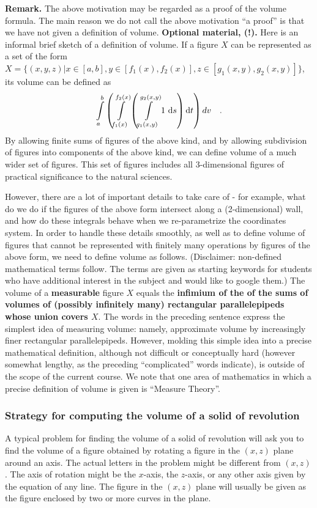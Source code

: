 \documentclass[12pt]{book}
\renewcommand{\emph}{\textbf}
\begin{document}
\textbf{Remark.} The above motivation may be regarded as a proof of the volume formula. The main reason we do not call the above motivation ``a proof'' is that we have not given a definition of volume. \textbf{Optional material, (!).} Here is an informal brief sketch  of a definition of volume. If a figure $X$ can be represented as a set of the form $X= \{(x,y,z)| x\in [a,b], y\in [f_1(x), f_2(x)], z\in [g_1(x,y),  g_2(x,y)]\}$, its volume can be defined as
\[
\int\limits_a^b \left(\int\limits_{f_1(x)}^{f_2(x)}\left(\int\limits_{g_1(x,y)}^{g_2(x,y)} 1 ~ {\normalfont \text{d}} s \right){\normalfont \text{d}} t \right)dv \quad .
\]
By allowing finite sums of figures of the above kind, and by allowing subdivision of figures into components of the above kind, we can define volume of a much wider set of figures. This set of figures includes all 3-dimensional figures of practical significance to  the natural sciences.

However, there are a lot of important details to take care of - for example, what do we do if the figures of the above form intersect along a (2-dimensional) wall, and how do these integrals behave when we re-parametrize the coordinates system. In order to handle these details smoothly, as well as to define volume of figures that cannot be represented with finitely many operations by  figures of the above form,  we need to define volume as follows. (Disclaimer: non-defined mathematical terms follow. The terms are given as starting keywords for students who have additional interest in the subject and would like to google them.) The volume of a \emph{measurable} figure $X$ equals the \emph{infimium of the of the sums of volumes of (possibly infinitely many) rectangular parallelepipeds whose union covers $X$}. The words in the preceding sentence express the simplest idea of measuring volume: namely, approximate volume by increasingly finer rectangular parallelepipeds. However, molding this simple idea into a precise mathematical definition, although not difficult or conceptually hard (however somewhat lengthy, as the preceding ``complicated'' words indicate), is outside of the scope of the current course. We note that one area of mathematics in which a precise definition of volume is given is ``Measure Theory''.
\subsubsection{Strategy for computing the volume of a solid of revolution}

A typical problem for finding the volume of a solid of revolution will ask you to find the volume of a figure obtained by rotating a figure in the $(x,z)$ plane around an axis. The actual letters in the problem might be different from $(x,z)$. The axis of rotation might be the $x$-axis, the $z$-axis, or any other axis given by the equation of any line. The figure in the $(x,z)$ plane will usually be given as the figure enclosed by two or more curves in the plane.
\end{document}
